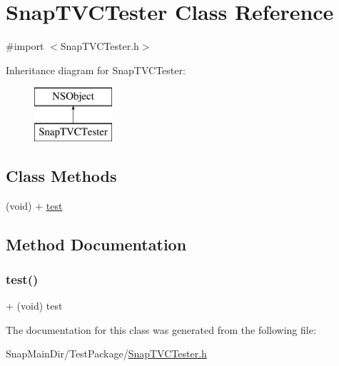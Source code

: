 \hypertarget{interface_snap_t_v_c_tester}{}\section{Snap\+T\+V\+C\+Tester Class Reference}
\label{interface_snap_t_v_c_tester}


{\ttfamily \#import $<$Snap\+T\+V\+C\+Tester.\+h$>$}

Inheritance diagram for Snap\+T\+V\+C\+Tester\+:\begin{figure}[H]
\begin{center}
\leavevmode
\includegraphics[height=2.000000cm]{interface_snap_t_v_c_tester}
\end{center}
\end{figure}
\subsection*{Class Methods}
\begin{DoxyCompactItemize}
\item 
(void) + \hyperlink{interface_snap_t_v_c_tester_a2c5757c3aecc992761428949a2373214}{test}
\end{DoxyCompactItemize}


\subsection{Method Documentation}
\hypertarget{interface_snap_t_v_c_tester_a2c5757c3aecc992761428949a2373214}{}\label{interface_snap_t_v_c_tester_a2c5757c3aecc992761428949a2373214} 
\subsubsection{\texorpdfstring{test()}{test()}}
{\footnotesize\ttfamily + (void) test \begin{DoxyParamCaption}{ }\end{DoxyParamCaption}}



The documentation for this class was generated from the following file\+:\begin{DoxyCompactItemize}
\item 
Snap\+Main\+Dir/\+Test\+Package/\hyperlink{_snap_t_v_c_tester_8h}{Snap\+T\+V\+C\+Tester.\+h}\end{DoxyCompactItemize}
